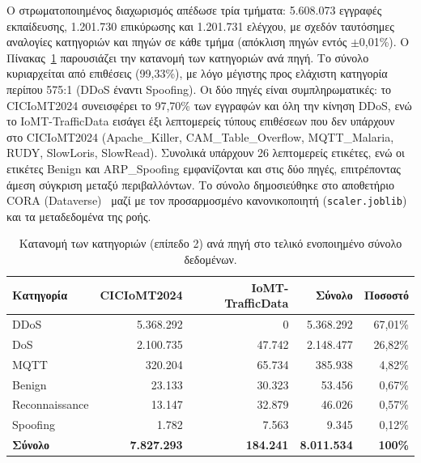 
Ο στρωματοποιημένος διαχωρισμός απέδωσε τρία τμήματα: 5.608.073 εγγραφές εκπαίδευσης, 1.201.730 επικύρωσης και 1.201.731 ελέγχου, με σχεδόν ταυτόσημες αναλογίες κατηγοριών και πηγών σε κάθε τμήμα (απόκλιση πηγών εντός $\pm$0,01\%). Ο Πίνακας~\ref{gr:tab:classes} παρουσιάζει την κατανομή των κατηγοριών ανά πηγή. Το σύνολο κυριαρχείται από επιθέσεις (99,33\%), με λόγο μέγιστης προς ελάχιστη κατηγορία περίπου 575:1 (DDoS έναντι Spoofing). Οι δύο πηγές είναι συμπληρωματικές: το CICIoMT2024 συνεισφέρει το 97,70\% των εγγραφών και όλη την κίνηση DDoS, ενώ το IoMT-TrafficData εισάγει έξι λεπτομερείς τύπους επιθέσεων που δεν υπάρχουν στο CICIoMT2024 (Apache\_Killer, CAM\_Table\_Overflow, MQTT\_Malaria, RUDY, SlowLoris, SlowRead). Συνολικά υπάρχουν 26 λεπτομερείς ετικέτες, ενώ οι ετικέτες Benign και ARP\_Spoofing εμφανίζονται και στις δύο πηγές, επιτρέποντας άμεση σύγκριση μεταξύ περιβαλλόντων. Το σύνολο δημοσιεύθηκε στο αποθετήριο CORA (Dataverse)~\cite{unified_iomt_csuc2026} μαζί με τον προσαρμοσμένο κανονικοποιητή (\texttt{scaler.joblib}) και τα μεταδεδομένα της ροής.

\begin{table}[!htbp]
\centering
\caption[]{Κατανομή των κατηγοριών (επίπεδο 2) ανά πηγή στο τελικό ενοποιημένο σύνολο δεδομένων.}
\label{gr:tab:classes}
\small
\begin{tabular}{@{}l r r r r@{}}
\toprule
\textbf{Κατηγορία} & \textbf{CICIoMT2024} & \textbf{IoMT-TrafficData} & \textbf{Σύνολο} & \textbf{Ποσοστό} \\
\midrule
DDoS           & 5.368.292 & 0      & 5.368.292 & 67,01\% \\
DoS            & 2.100.735 & 47.742 & 2.148.477 & 26,82\% \\
MQTT           & 320.204   & 65.734 & 385.938   & 4,82\% \\
Benign         & 23.133    & 30.323 & 53.456    & 0,67\% \\
Reconnaissance & 13.147    & 32.879 & 46.026    & 0,57\% \\
Spoofing       & 1.782     & 7.563  & 9.345     & 0,12\% \\
\midrule
\textbf{Σύνολο} & \textbf{7.827.293} & \textbf{184.241} & \textbf{8.011.534} & \textbf{100\%} \\
\bottomrule
\end{tabular}
\end{table}


